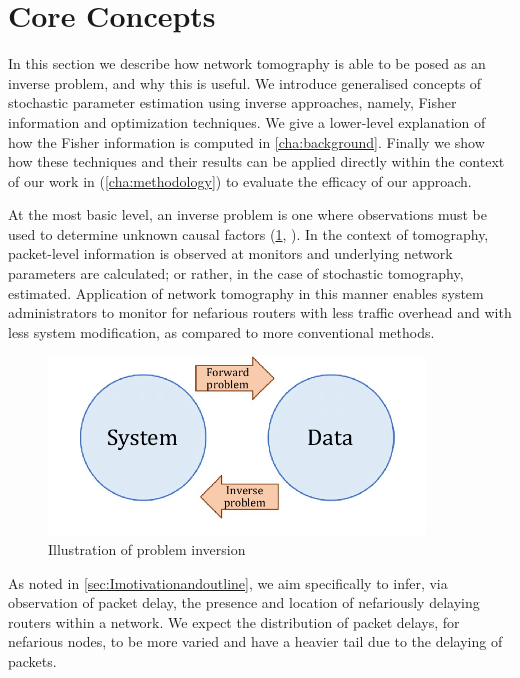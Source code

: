 \section{Core Concepts}
\label{sec:Icoreconcepts}

In this section we describe how network tomography is able to be posed as an inverse problem, and why this is useful. We introduce generalised concepts of stochastic parameter estimation using inverse approaches, namely, Fisher information and optimization techniques. We give a lower-level explanation of how the Fisher information is computed in \cref{cha:background}. Finally we show how these techniques and their results can be applied directly within the context of our work in (\cref{cha:methodology}) to evaluate the efficacy of our approach.\par
At the most basic level, an inverse problem is one where observations must be used to determine unknown causal factors (\cref{fig:probleminv}, \cite{sadri_effect_2019}). In the context of tomography, packet-level information is observed at monitors and underlying network parameters are calculated; or rather, in the case of stochastic tomography, estimated. Application of network tomography in this manner enables system administrators to monitor for nefarious routers with less traffic overhead and with less system modification, as compared to more conventional methods.\par
\begin{figure}
    \centering
    \includegraphics[width=10cm]{figs/intro/inverse_problems.png}
    \caption[Illustration of problem inversion]{Illustration of problem inversion \cite{sadri_effect_2019}}
    \label{fig:probleminv}
\end{figure}
As noted in \cref{sec:Imotivationandoutline}, we aim specifically to infer, via observation of packet delay, the presence and location of nefariously delaying routers within a network. We expect the distribution of packet delays, for nefarious nodes, to be more varied and have a heavier tail due to the delaying of packets.\par
